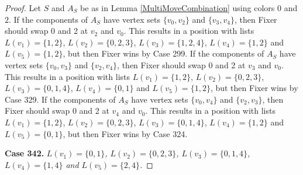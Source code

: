 \documentclass[12pt]{amsart}
\theoremstyle{plain}
\theoremstyle{definition}
\theoremstyle{remark}
\begin{document}
\begin{proof}
Let $S$ and $A_S$ be as in Lemma \ref{MultiMoveCombination} using colors $0$ and $2$. If the components of $A_S$ have vertex sets $\{v_0, v_2\}$ and $\{v_3, v_4\}$, then Fixer should swap 0 and 2 at $v_2$ and $v_0$. This results in a position with lists $L(v_1) = \{1, 2\}$, $L(v_2) = \{0, 2, 3\}$, $L(v_3) = \{1, 2, 4\}$, $L(v_4) = \{1, 2\}$ and $L(v_5) = \{1, 2\}$, but then Fixer wins by Case 299. If the components of $A_S$ have vertex sets $\{v_0, v_3\}$ and $\{v_2, v_4\}$, then Fixer should swap 0 and 2 at $v_3$ and $v_0$. This results in a position with lists $L(v_1) = \{1, 2\}$, $L(v_2) = \{0, 2, 3\}$, $L(v_3) = \{0, 1, 4\}$, $L(v_4) = \{0, 1\}$ and $L(v_5) = \{1, 2\}$, but then Fixer wins by Case 329. If the components of $A_S$ have vertex sets $\{v_0, v_4\}$ and $\{v_2, v_3\}$, then Fixer should swap 0 and 2 at $v_4$ and $v_0$. This results in a position with lists $L(v_1) = \{1, 2\}$, $L(v_2) = \{0, 2, 3\}$, $L(v_3) = \{0, 1, 4\}$, $L(v_4) = \{1, 2\}$ and $L(v_5) = \{0, 1\}$, but then Fixer wins by Case 324. 

\noindent\textbf{Case 342.  }\textit{$L(v_1) = \{0, 1\}$, $L(v_2) = \{0, 2, 3\}$, $L(v_3) = \{0, 1, 4\}$, $L(v_4) = \{1, 4\}$ and $L(v_5) = \{2, 4\}$.}


\end{proof}
\end{document}
